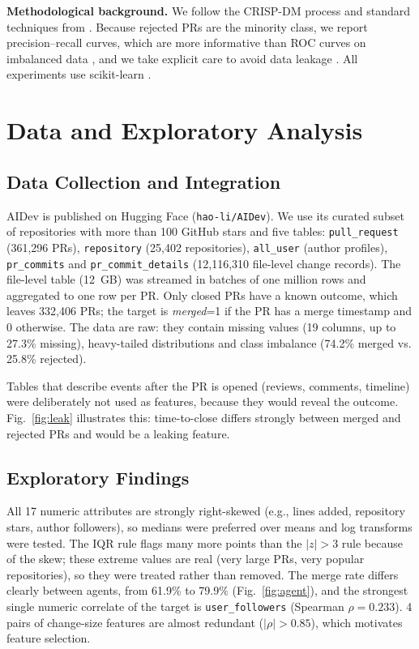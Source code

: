 \documentclass[conference]{IEEEtran}
\begin{document}
\textbf{Methodological background.} We follow the CRISP-DM process \cite{chapman2000crisp} and standard techniques from \cite{han2011data}. Because rejected PRs are the minority class, we report precision--recall curves, which are more informative than ROC curves on imbalanced data \cite{saito2015precision}, and we take explicit care to avoid data leakage \cite{kaufman2012leakage}. All experiments use scikit-learn \cite{pedregosa2011scikit}.

\section{Data and Exploratory Analysis}
\subsection{Data Collection and Integration}
AIDev is published on Hugging Face (\texttt{hao-li/AIDev}). We use its curated subset of repositories with more than 100 GitHub stars and five tables: \texttt{pull\_request} (361,296 PRs), \texttt{repository} (25,402 repositories), \texttt{all\_user} (author profiles), \texttt{pr\_commits} and \texttt{pr\_commit\_details} (12,116,310 file-level change records). The file-level table (12~GB) was streamed in batches of one million rows and aggregated to one row per PR. Only closed PRs have a known outcome, which leaves 332,406 PRs; the target is \textit{merged}=1 if the PR has a merge timestamp and 0 otherwise. The data are raw: they contain missing values (19 columns, up to 27.3\% missing), heavy-tailed distributions and class imbalance (74.2\% merged vs. 25.8\% rejected).

Tables that describe events after the PR is opened (reviews, comments, timeline) were deliberately not used as features, because they would reveal the outcome. Fig.~\ref{fig:leak} illustrates this: time-to-close differs strongly between merged and rejected PRs and would be a leaking feature.

\subsection{Exploratory Findings}
All 17 numeric attributes are strongly right-skewed (e.g., lines added, repository stars, author followers), so medians were preferred over means and log transforms were tested. The IQR rule flags many more points than the $|z|>3$ rule because of the skew; these extreme values are real (very large PRs, very popular repositories), so they were treated rather than removed. The merge rate differs clearly between agents, from 61.9\% to 79.9\% (Fig.~\ref{fig:agent}), and the strongest single numeric correlate of the target is \texttt{user\_followers} (Spearman $\rho=0.233$). 4 pairs of change-size features are almost redundant ($|\rho|>0.85$), which motivates feature selection.
\end{document}
